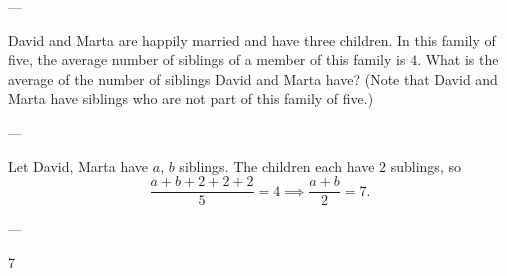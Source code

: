 
---

David and Marta are happily married and have three children. In this family of five, the average number of siblings of a member of this family is $4$. What is the average of the number of siblings David and Marta have? (Note that David and Marta have siblings who are not part of this family of five.)

---

Let David, Marta have $a$, $b$ siblings. The children each have $2$ sublings, so \[\frac{a+b+2+2+2}5=4\implies\frac{a+b}2=7.\]

---

7
